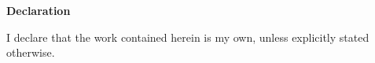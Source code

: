 \thispagestyle{plain}
\mbox{}
\vspace{60mm}
\begin{center}
    \textbf{Declaration}
\end{center}
I declare that the work contained herein is my own, unless explicitly stated otherwise.
\newpage